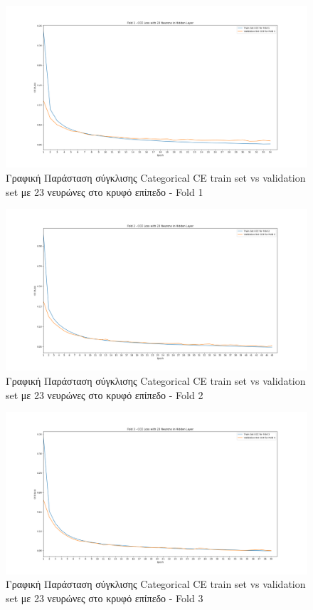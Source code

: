 \documentclass[12pt,a4paper]{article}
\begin{document}
\begin{figure}[H]
	\includegraphics[width=\textwidth]{19. Train vs Validation Fold 1.png}
	\caption{Γραφική Παράσταση σύγκλισης Categorical CE train set vs validation set με 23 νευρώνες στο κρυφό επίπεδο - Fold 1}
\end{figure}

\begin{figure}[H]
	\includegraphics[width=\textwidth]{20. Train vs Validation Fold 2.png}
	\caption{Γραφική Παράσταση σύγκλισης Categorical CE train set vs validation set με 23 νευρώνες στο κρυφό επίπεδο - Fold 2}
\end{figure}

\begin{figure}[H]
	\includegraphics[width=\textwidth]{21. Train vs Validation Fold 3.png}
	\caption{Γραφική Παράσταση σύγκλισης Categorical CE train set vs validation set με 23 νευρώνες στο κρυφό επίπεδο - Fold 3}
\end{figure}
\end{document}
